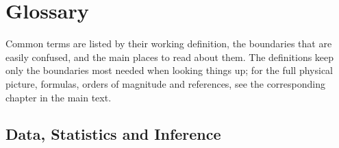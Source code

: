 \chapter{Glossary}
\label{app:c}

Common terms are listed by their working definition, the boundaries that are easily confused, and the main places to read about them. The definitions keep only the boundaries most needed when looking things up; for the full physical picture, formulas, orders of magnitude and references, see the corresponding chapter in the main text.

\section{Data, Statistics and Inference}
\label{appsec:c-data}

